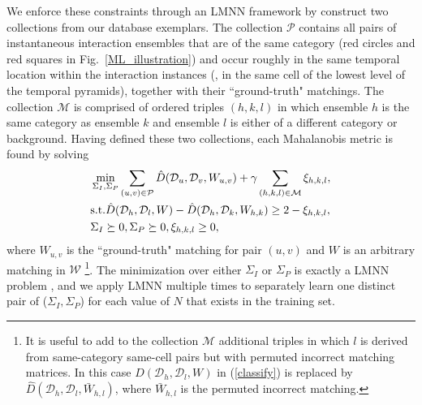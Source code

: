 We enforce these constraints through an LMNN framework by construct two collections from our database exemplars. The collection $\mathcal{P}$ contains all pairs of instantaneous interaction ensembles that are of the same category (red circles and red squares in Fig.~\ref{ML_illustration}) and occur roughly in the same temporal location within the interaction instances (\ie, in the same cell of the lowest level of the temporal pyramids), together with their ``ground-truth" matchings. The collection $\mathcal{M}$ is comprised of ordered triples $(h,k,l)$ in which ensemble $h$ is the same category as ensemble $k$ and ensemble $l$ is either of a different category or background. Having defined these two collections, each Mahalanobis metric is found by solving
\begin{equation}
\vspace{-5pt}
\label{classify}
\begin{split}
&\min_{\Sigma_{I}, \Sigma_{P}} \sum_{(u,v)\in\mathcal{P}}\hat{D}(\mathcal{D}_{u}, \mathcal{D}_{v}, W_{u,v})+\gamma\sum_{(h,k,l)\in\mathcal{M}}\xi_{h,k,l},\\
&\textup{s.t.}  \hat{D}(\mathcal{D}_{h}, \mathcal{D}_{l}, W)-\hat{D}(\mathcal{D}_{h}, \mathcal{D}_{k}, W_{h,k})\ge 2-\xi_{h,k,l},\\
& \Sigma_{I}\succeq 0, \Sigma_{P}\succeq 0, \xi_{h,k,l}\ge0,
\end{split}
\end{equation}
where $W_{u,v}$ is the ``ground-truth" matching for pair $(u,v)$ and $W$ is an arbitrary matching in $\mathcal{W}$ \footnote{It is useful to add to the collection $\mathcal{M}$ additional triples in which $l$ is derived from same-category same-cell pairs but with permuted incorrect matching matrices. In this case $\hat{D}(\mathcal{D}_{h}, \mathcal{D}_{l}, W)$ in (\ref{classify}) is replaced by $\hat{D}(\mathcal{D}_{h}, \mathcal{D}_{l}, \bar{W}_{h,l})$, where $\bar{W}_{h,l}$ is the permuted incorrect matching.}. The minimization over either $\Sigma_{I}$ or $\Sigma_{P}$ is exactly a LMNN problem \cite{Weinberger:ML}, and we apply LMNN multiple times to separately learn one distinct pair of ($\Sigma_{I}, \Sigma_{P}$) for each value of $N$ that exists in the training set. 


